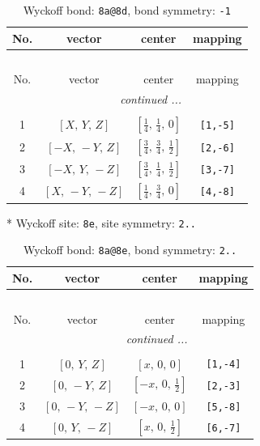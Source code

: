\documentclass[fleqn,8pt]{jsarticle}
\begin{document}
\begin{longtable}{cccc}
\caption{Wyckoff bond: {\tt 8a@8d}, bond symmetry: {\tt -1}}
 \\
 \hline \hline
No. & vector & center & mapping \\ \hline \endfirsthead

\multicolumn{3}{l}{\tablename\ \thetable{}} \\
 \hline \hline
No. & vector & center & mapping \\ \hline \endhead

 \hline \hline
\multicolumn{3}{r}{\footnotesize\it continued ...} \\ \endfoot

 \hline \hline
\multicolumn{3}{r}{} \\ \endlastfoot

1 & $\left[ X,\, Y,\, Z \right]$ & $\left[ \frac{1}{4},\, \frac{1}{4},\, 0 \right]$ & {\tt [1,-5]} \\ \hline
2 & $\left[ - X,\, - Y,\, Z \right]$ & $\left[ \frac{3}{4},\, \frac{3}{4},\, \frac{1}{2} \right]$ & {\tt [2,-6]} \\ \hline
3 & $\left[ - X,\, Y,\, - Z \right]$ & $\left[ \frac{3}{4},\, \frac{1}{4},\, \frac{1}{2} \right]$ & {\tt [3,-7]} \\ \hline
4 & $\left[ X,\, - Y,\, - Z \right]$ & $\left[ \frac{1}{4},\, \frac{3}{4},\, 0 \right]$ & {\tt [4,-8]} \\
\end{longtable}
* Wyckoff site: {\tt 8e}, site symmetry: {\tt 2..}
\renewcommand{\arraystretch}{1.2}
\begin{longtable}{cccc}
\caption{Wyckoff bond: {\tt 8a@8e}, bond symmetry: {\tt 2..}}
 \\
 \hline \hline
No. & vector & center & mapping \\ \hline \endfirsthead

\multicolumn{3}{l}{\tablename\ \thetable{}} \\
 \hline \hline
No. & vector & center & mapping \\ \hline \endhead

 \hline \hline
\multicolumn{3}{r}{\footnotesize\it continued ...} \\ \endfoot

 \hline \hline
\multicolumn{3}{r}{} \\ \endlastfoot

1 & $\left[ 0,\, Y,\, Z \right]$ & $\left[ x,\, 0,\, 0 \right]$ & {\tt [1,-4]} \\ \hline
2 & $\left[ 0,\, - Y,\, Z \right]$ & $\left[ - x,\, 0,\, \frac{1}{2} \right]$ & {\tt [2,-3]} \\ \hline
3 & $\left[ 0,\, - Y,\, - Z \right]$ & $\left[ - x,\, 0,\, 0 \right]$ & {\tt [5,-8]} \\ \hline
4 & $\left[ 0,\, Y,\, - Z \right]$ & $\left[ x,\, 0,\, \frac{1}{2} \right]$ & {\tt [6,-7]} \\
\end{longtable}
\end{document}
